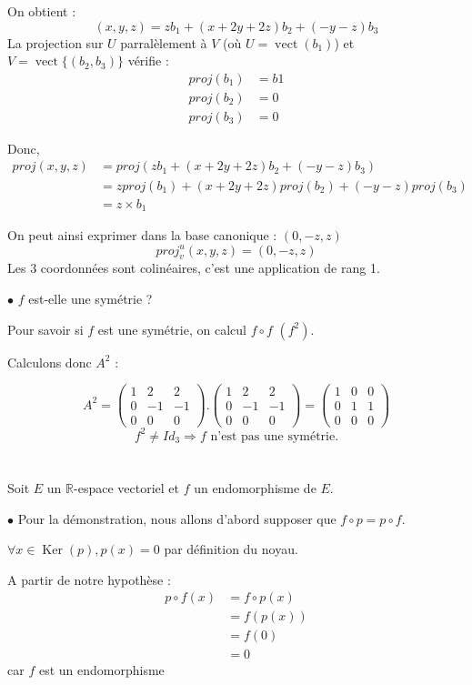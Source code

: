\documentclass[a4paper,12pt]{article}
\DeclareMathOperator{\Ker}{Ker}
\DeclareMathOperator{\vect}{vect}
\begin{document}
On obtient : 
$$(x,y,z)=zb_1+(x+2y+2z)b_2+(-y-z)b_3$$
La projection sur $U$ parralèlement à $V$ (où $U=\vect(b_1)$) et $V=\vect\{(b_2,b_3)\}$ vérifie :
\begin{align*}
    proj(b_1)&=b1 \\
    proj(b_2)&=0 \\
    proj(b_3)&=0
\end{align*}

Donc,
\begin{align*}
    proj(x,y,z)&=proj(zb_1+(x+2y+2z)b_2+(-y-z)b_3) \\
    &=zproj(b_1)+(x+2y+2z)proj(b_2)+(-y-z)proj(b_3) \\
    &=z\times b_1
\end{align*}

On peut ainsi exprimer dans la base canonique :  $(0,-z,z)$
$$proj^u_v(x,y,z)=(0,-z,z)$$
Les 3 coordonnées sont colinéaires, c'est une application de rang 1.

$\bullet$ $f$ est-elle une symétrie ?

Pour savoir si $f$ est une symétrie, on calcul $f\circ f$ $(f^2)$.

Calculons donc $A^2$ :

\[A^2=\begin{pmatrix}1&2&2\\0&-1&-1\\0&0&0\end{pmatrix}.\begin{pmatrix}1&2&2\\0&-1&-1\\0&0&0\end{pmatrix}=\begin{pmatrix}1&0&0\\0&1&1\\0&0&0\end{pmatrix}\]
$$f^2\neq Id_3\Rightarrow f \mbox{ n'est pas une symétrie.}$$

\section{}

Soit $E$ un $\mathbb{R}$-espace vectoriel et $f$ un endomorphisme de $E$.

$\bullet$ Pour la démonstration, nous allons d'abord supposer que $f\circ p = p\circ f$.

$\forall x \in \Ker(p), p(x) = 0$ par définition du noyau. 

A partir de notre hypothèse :
\begin{align*}
  p \circ f(x) & = f \circ p(x)\\
              & = f(p(x))\\
              & = f(0)\\
              & = 0
\end{align*}
car $f$ est un endomorphisme
\end{document}
